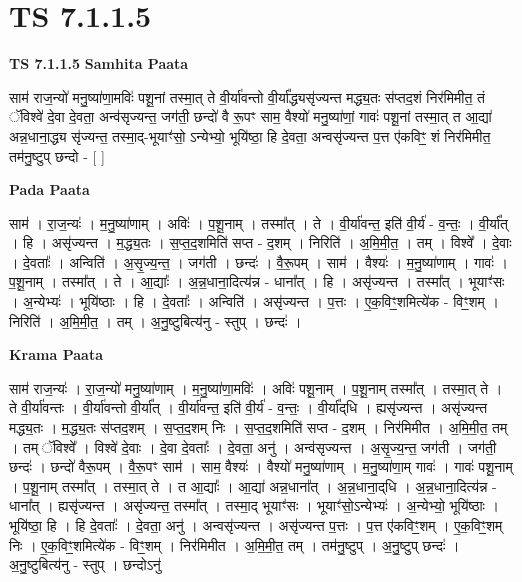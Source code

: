 \documentclass[17pt]{extarticle}
\begin{document}
\section{ TS 7.1.1.5 }

\textbf{TS 7.1.1.5 } \newline
\textbf{Samhita Paata} \newline

साम॑ राज॒न्यो॑ मनु॒ष्या॑णा॒मविः॑ पशू॒नां तस्मा॒त् ते वी॒र्या॑वन्तो वी॒र्या᳚द्ध्यसृ॑ज्यन्त मद्ध्य॒तः स॑प्तद॒शं निर॑मिमीत॒ तं ॅविश्वे॑ दे॒वा दे॒वता॒ अन्व॑सृज्यन्त॒ जग॑ती॒ छन्दो॑ वै रू॒पꣳ साम॒ वैश्यो॑ मनु॒ष्या॑णां॒ गावः॑ पशू॒नां तस्मा॒त् त आ॒द्या॑ अन्न॒धाना॒द्ध्य सृ॑ज्यन्त॒ तस्मा॒द्-भूयाꣳ॑सो॒ ऽन्येभ्यो॒ भूयि॑ष्ठा॒ हि दे॒वता॒ अन्वसृ॑ज्यन्त प॒त्त ए॑कविꣳ॒॒ शं निर॑मिमीत॒ तम॑नु॒ष्टुप् छन्दो - [  ] \newline

\textbf{Pada Paata} \newline

साम॑ । रा॒ज॒न्यः॑ । म॒नु॒ष्या॑णाम् । अविः॑ । प॒शू॒नाम् । तस्मा᳚त् । ते । वी॒र्या॑वन्त॒ इति॑ वी॒र्य॑ - व॒न्तः॒ । वी॒र्या᳚त् । हि । असृ॑ज्यन्त । म॒द्ध्य॒तः । स॒प्त॒द॒शमिति॑ सप्त - द॒शम् । निरिति॑ । अ॒मि॒मी॒त॒ । तम् । विश्वे᳚ । दे॒वाः । दे॒वताः᳚ । अन्विति॑ । अ॒सृ॒ज्य॒न्त॒ । जग॑ती । छन्दः॑ । वै॒रू॒पम् । साम॑ । वैश्यः॑ । म॒नु॒ष्या॑णाम् । गावः॑ । प॒शू॒नाम् । तस्मा᳚त् । ते । आ॒द्याः᳚ । अ॒न्न॒धाना॒दित्य॑न्न - धाना᳚त् । हि । असृ॑ज्यन्त । तस्मा᳚त् । भूयाꣳ॑सः । अ॒न्येभ्यः॑ । भूयि॑ष्ठाः । हि । दे॒वताः᳚ । अन्विति॑ । असृ॑ज्यन्त । प॒त्तः । ए॒क॒विꣳ॒॒शमित्ये॑क - विꣳ॒॒शम् । निरिति॑ । अ॒मि॒मी॒त॒ । तम् । अ॒नु॒ष्टुबित्य॑नु - स्तुप् । छन्दः॑ ।  \newline


\textbf{Krama Paata} \newline

साम॑ राज॒न्यः॑ । रा॒ज॒न्यो॑ मनु॒ष्या॑णाम् । म॒नु॒ष्या॑णा॒मविः॑ । अविः॑ पशू॒नाम् । प॒शू॒नाम् तस्मा᳚त् । तस्मा॒त् ते । ते वी॒र्या॑वन्तः । वी॒र्या॑वन्तो वी॒र्या᳚त् । वी॒र्या॑वन्त॒ इति॑ वी॒र्य॑ - व॒न्तः॒ । वी॒र्या᳚द्‌धि । ह्यसृ॑ज्यन्त । असृ॑ज्यन्त मद्ध्य॒तः । म॒द्ध्य॒तः स॑प्तद॒शम् । स॒प्त॒द॒शम् निः । स॒प्त॒द॒शमिति॑ सप्त - द॒शम् । निर॑मिमीत । अ॒मि॒मी॒त॒ तम् । तम् ॅविश्वे᳚ । विश्वे॑ दे॒वाः । दे॒वा दे॒वताः᳚ । दे॒वता॒ अनु॑ । अन्व॑सृज्यन्त । अ॒सृ॒ज्य॒न्त॒ जग॑ती । जग॑ती॒ छन्दः॑ । छन्दो॑ वैरू॒पम् । वै॒रू॒पꣳ साम॑ । साम॒ वैश्यः॑ । वैश्यो॑ मनु॒ष्या॑णाम् । म॒नु॒ष्या॑णा॒म् गावः॑ । गावः॑ पशू॒नाम् । प॒शू॒नाम् तस्मा᳚त् । तस्मा॒त् ते । त आ॒द्याः᳚ । आ॒द्या॑ अन्न॒धाना᳚त् । अ॒न्न॒धाना॒द्‌धि । अ॒न्न॒धाना॒दित्य॑न्न - धाना᳚त् । ह्यसृ॑ज्यन्त । असृ॑ज्यन्त॒ तस्मा᳚त् । तस्मा॒द् भूयाꣳ॑सः । भूयाꣳ॑सो॒ऽन्येभ्यः॑ । अ॒न्येभ्यो॒ भूयि॑ष्ठाः । भूयि॑ष्ठा॒ हि । हि दे॒वताः᳚ । दे॒वता॒ अनु॑ । अन्वसृ॑ज्यन्त । असृ॑ज्यन्त प॒त्तः । प॒त्त ए॑कविꣳ॒॒शम् । ए॒क॒विꣳ॒॒शम् निः । ए॒क॒विꣳ॒॒शमित्ये॑क - विꣳ॒॒शम् । निर॑मिमीत । अ॒मि॒मी॒त॒ तम् । तम॑नु॒ष्टुप् । अ॒नु॒ष्टुप् छन्दः॑ । अ॒नु॒ष्टुबित्य॑नु - स्तुप् । छन्दोऽनु॑ \newline
\end{document}
